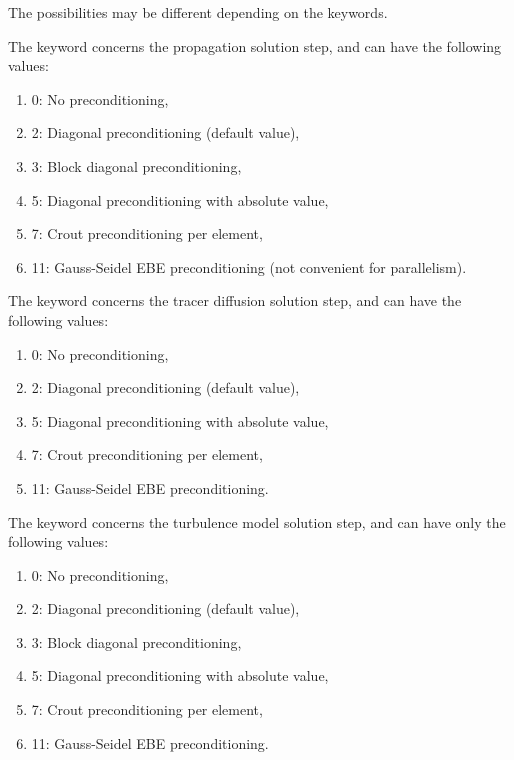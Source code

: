  The possibilities may be different depending on the keywords.

 The keyword  concerns the propagation solution step, and can have the following values:

\begin{enumerate}
\item [\nonumber]  0: No preconditioning,

\item[\nonumber]   2: Diagonal preconditioning (default value),

\item [\nonumber]  3: Block diagonal preconditioning,

\item  [\nonumber] 5: Diagonal preconditioning with absolute value,

\item [\nonumber]  7: Crout preconditioning per element,

\item [\nonumber]  11: Gauss-Seidel EBE preconditioning (not convenient for parallelism).
\end{enumerate}

 The keyword  concerns the tracer diffusion solution step, and can have the following values:

\begin{enumerate}
\item  [\nonumber] 0: No preconditioning,

\item  [\nonumber] 2: Diagonal preconditioning (default value),

\item  [\nonumber] 5: Diagonal preconditioning with absolute value,

\item  [\nonumber] 7: Crout preconditioning per element,

\item  [\nonumber] 11: Gauss-Seidel EBE preconditioning.
\end{enumerate}

 The keyword  concerns the turbulence model solution step, and can have only the following values:

\begin{enumerate}
\item [\nonumber] 0: No preconditioning,

\item [\nonumber] 2: Diagonal preconditioning (default value),

\item[\nonumber]  3: Block diagonal preconditioning,

\item [\nonumber] 5: Diagonal preconditioning with absolute value,

\item [\nonumber] 7: Crout preconditioning per element,

\item[\nonumber]  11: Gauss-Seidel EBE preconditioning.
\end{enumerate}

